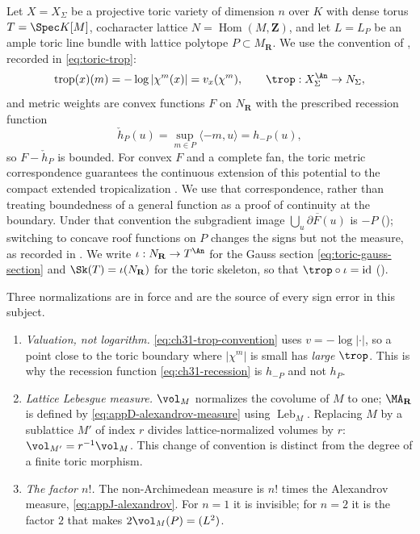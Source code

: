 Let $X=X_\Sigma$ be a projective toric variety of dimension $n$ over
$K$ with dense torus $T=\Spec K[M]$, cocharacter lattice
$N=\operatorname{Hom}(M,\mathbf Z)$, and let $L=L_P$ be an ample toric
line bundle with lattice polytope $P\subset M_\mathbf R$.  We use the
convention of , recorded in
\eqref{eq:toric-trop}:
\begin{equation}
\label{eq:ch31-trop-convention}
 \operatorname{trop}(x)(m)=-\log|\chi^m(x)|=v_x(\chi^m),
 \qquad
 \trop:X_\Sigma^{\An}\to N_\Sigma ,
\end{equation}
and metric weights are convex functions $F$ on $N_\mathbf R$ with the
prescribed recession function
\begin{equation}
\label{eq:ch31-recession}
 \check h_P(u)=\sup_{m\in P}\langle-m,u\rangle=h_{-P}(u),
\end{equation}
so $F-\check h_P$ is bounded.  For convex $F$ and a complete fan,
the toric metric correspondence guarantees the continuous extension of
this potential to the compact extended tropicalization
\cite[Section~5.3.7 and Theorem~5.3.11]{BGJKK25}.  We use that
correspondence, rather than treating boundedness of a general function
as a proof of continuity at the boundary.  Under that convention the subgradient
image $\overline{\bigcup_u\partial F(u)}$ is $-P$
(); switching to concave roof functions on
$P$ changes the signs but not the measure, as recorded in
.  We write $\iota:N_\mathbf R\to T^{\An}$ for the
Gauss section \eqref{eq:toric-gauss-section} and $\Sk(T)=\iota(N_\mathbf R)$
for the toric skeleton, so that $\trop\circ\iota=\operatorname{id}$
().

Three normalizations are in force and are the source of every sign error in
this subject.

\begin{enumerate}
\item\label{itm:ch31-toric:trop}
 \emph{Valuation, not logarithm.}  \eqref{eq:ch31-trop-convention} uses
 $v=-\log|\cdot|$, so a point close to the toric boundary where
 $|\chi^m|$ is small has \emph{large} $\trop$.  This is why the
 recession function \eqref{eq:ch31-recession} is $h_{-P}$ and not
 $h_P$.
\item\label{itm:ch31-toric:lattice}
 \emph{Lattice Lebesgue measure.}  $\vol_M$ normalizes the covolume of
 $M$ to one; $\MA_{\mathbf R}$ is defined by
 \eqref{eq:appD-alexandrov-measure} using $\operatorname{Leb}_M$.  Replacing
 $M$ by a sublattice $M'$ of index $r$ divides lattice-normalized volumes
 by $r$: $\vol_{M'}=r^{-1}\vol_M$.  This change of convention is distinct
 from the degree of a finite toric morphism.
\item\label{itm:ch31-toric:factorial}
 \emph{The factor $n!$.}  The non-Archimedean measure is $n!$ times the
 Alexandrov measure, \eqref{eq:appJ-alexandrov}.  For $n=1$ it is
 invisible; for $n=2$ it is the factor $2$ that makes
 $2\vol_M(P)=(L^2)$.
\end{enumerate}


